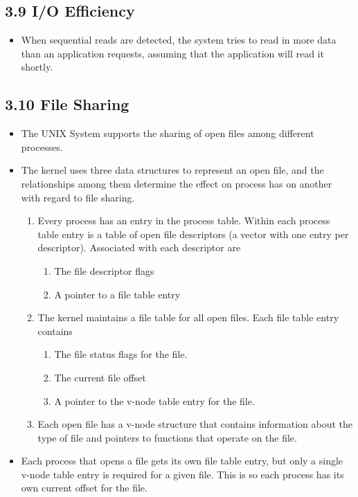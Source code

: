 \documentclass[]{article}
\begin{document}
\subsection*{3.9 I/O Efficiency}
\begin{itemize}
\item When sequential reads are detected, the system tries to read in more data
than an application requests, assuming that the application will read it
shortly.
\end{itemize}

\subsection*{3.10 File Sharing}
\begin{itemize}
\item The UNIX System supports the sharing of open files among different
processes.
\item The kernel uses three data structures to represent an open file, and the
relationships among them determine the effect on process has on another with
regard to file sharing.
\begin{enumerate}
\item Every process has an entry in the process table. Within each process table
entry is a table of open file descriptors (a vector with one entry per
descriptor). Associated with each descriptor are
\begin{enumerate}
\item The file descriptor flags
\item A pointer to a file table entry
\end{enumerate}
\item The kernel maintains a file table for all open files. Each file table
entry contains
\begin{enumerate}
\item The file status flags for the file.
\item The current file offset
\item A pointer to the v-node table entry for the file.
\end{enumerate}
\item Each open file has a v-node structure that contains information about the
type of file and pointers to functions that operate on the file.
\end{enumerate}
\item Each process that opens a file gets its own file table entry, but only a
single v-node table entry is required for a given file. This is so each process
has its own current offset for the file.
\end{itemize}
\end{document}
